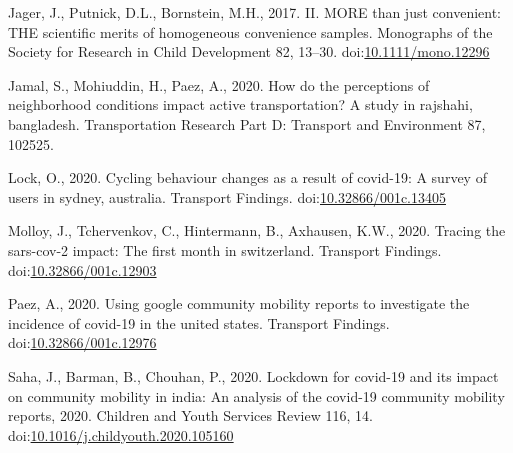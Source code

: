 \documentclass[]{elsarticle} %
\begin{document}
\leavevmode\hypertarget{ref-Jager2017convenience}{}%
Jager, J., Putnick, D.L., Bornstein, M.H., 2017. II. MORE than just
convenient: THE scientific merits of homogeneous convenience samples.
Monographs of the Society for Research in Child Development 82, 13--30.
doi:\href{https://doi.org/10.1111/mono.12296}{10.1111/mono.12296}

\leavevmode\hypertarget{ref-Jamal2020perceptions}{}%
Jamal, S., Mohiuddin, H., Paez, A., 2020. How do the perceptions of
neighborhood conditions impact active transportation? A study in
rajshahi, bangladesh. Transportation Research Part D: Transport and
Environment 87, 102525.

\leavevmode\hypertarget{ref-Lock2020cycling}{}%
Lock, O., 2020. Cycling behaviour changes as a result of covid-19: A
survey of users in sydney, australia. Transport Findings.
doi:\href{https://doi.org/10.32866/001c.13405}{10.32866/001c.13405}

\leavevmode\hypertarget{ref-Molloy2020tracing}{}%
Molloy, J., Tchervenkov, C., Hintermann, B., Axhausen, K.W., 2020.
Tracing the sars-cov-2 impact: The first month in switzerland. Transport
Findings.
doi:\href{https://doi.org/10.32866/001c.12903}{10.32866/001c.12903}

\leavevmode\hypertarget{ref-Paez2020using}{}%
Paez, A., 2020. Using google community mobility reports to investigate
the incidence of covid-19 in the united states. Transport Findings.
doi:\href{https://doi.org/10.32866/001c.12976}{10.32866/001c.12976}

\leavevmode\hypertarget{ref-Saha2020lockdown}{}%
Saha, J., Barman, B., Chouhan, P., 2020. Lockdown for covid-19 and its
impact on community mobility in india: An analysis of the covid-19
community mobility reports, 2020. Children and Youth Services Review
116, 14.
doi:\href{https://doi.org/10.1016/j.childyouth.2020.105160}{10.1016/j.childyouth.2020.105160}
\end{document}
